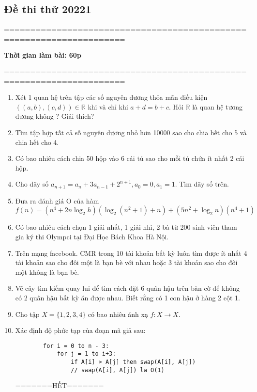 \documentclass[12pt,oneside]{book}
\begin{document}
\subsection{Đề thi thử 20221}
=====================================================================
\begin{center}
	\textbf{Thời gian làm bài: 60p}
\end{center}
=====================================================================
\begin{enumerate}[label = {\bf Câu \arabic*.}]
	\item Xét 1 quan hệ trên tập các số nguyên dương thỏa mãn điều kiện $((a,b),(c,d))\in \mathbb{R}$ khi và chỉ khi $a+d=b+c$. Hỏi $\mathbb{R}$ là quan hệ tương đương không ? Giải thích?
	\item Tìm tập hợp tất cả số nguyên dương nhỏ hơn 10000 sao cho chia hết cho 5 và chia hết cho 4.
	\item Có bao nhiêu cách chia 50 hộp vào 6 cái tủ sao cho mỗi tủ chứa ít nhất 2 cái hộp.
	\item Cho dãy số $a_{n+1}=a_n + 3a_{n-1}+2^{n+1}, a_0 = 0, a_1 = 1$. Tìm dãy số trên.
	\item Đưa ra đánh giá O của hàm $f(n) = (n^4+2n\log_2h)(\log_2(n^2+1)+n) + (5n^2
	+ \log_2n)(n^4+1)$
	\item Có bao nhiêu cách chọn 1 giải nhất, 1 giải nhì, 2 bà từ 200 sinh viên tham gia ký thi Olympci tại Đại Học Bách Khoa Hà Nội.
	\item Trên mạng facebook. CMR trong 10 tài khoản bất kỳ luôn tìm được ít nhất 4 tài khoản sao cho đôi một là bạn bè với nhau hoặc 3 tài khoản sao cho đôi một không là bạn bè.
	\item Vẽ cây tìm kiếm quay lui để tìm cách đặt 6 quân hậu trên bàn cờ để không có 2 quân hậu bất kỳ ăn được nhau. Biết rằng có 1 con hậu ở hàng 2 cột 1.
	\item Cho tập $X=\{1,2,3,4\}$ có bao nhiêu ánh xạ $f: X \longrightarrow X$.
	\item Xác định độ phức tạp của đoạn mã giả sau:
	\begin{lstlisting}
		for i = 0 to n - 3:
			for j = 1 to i+3:
				if A[i] > A[j] then swap(A[i], A[j])
				// swap(A[i], A[j]) la O(1)
	\end{lstlisting}
	\begin{center}
		=======HẾT=======
	\end{center}
\end{enumerate}
\end{document}
